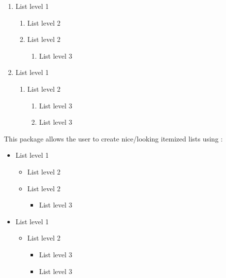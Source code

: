 \documentclass{beery}
\begin{document}
\begin{multicols}{2}
  \begin{enumerate}
    \item List level 1
    \begin{enumerate}
      \item List level 2
      \item List level 2
      \begin{enumerate}
        \item List level 3
      \end{enumerate}
    \end{enumerate}
    \item List level 1
    \begin{enumerate}
      \item List level 2
      \begin{enumerate}
        \item List level 3
        \item List level 3
      \end{enumerate}
    \end{enumerate}
  \end{enumerate}
\end{multicols}

This package allows the user to create nice\-/looking itemized lists using :

\begin{multicols}{2}
  \begin{itemize}
    \item List level 1
    \begin{itemize}
      \item List level 2
      \item List level 2
      \begin{itemize}
        \item List level 3
      \end{itemize}
    \end{itemize}
    \item List level 1
    \begin{itemize}
      \item List level 2
      \begin{itemize}
        \item List level 3
        \item List level 3
      \end{itemize}
    \end{itemize}
  \end{itemize}
\end{multicols}
\end{document}
